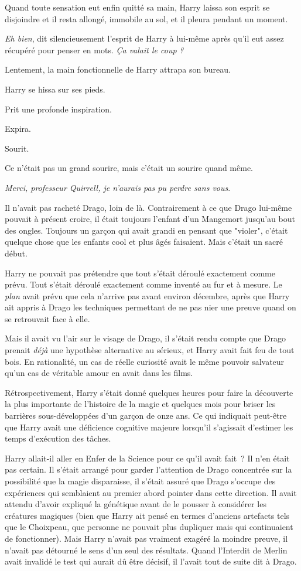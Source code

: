 Quand toute sensation eut enfin quitté sa main, Harry laissa son esprit se disjoindre et il resta allongé, immobile au sol, et il pleura pendant un moment.

\emph{Eh bien}, dit silencieusement l'esprit de Harry à lui-même après qu'il eut assez récupéré pour penser en mots. \emph{Ça valait le coup} \emph{?}

Lentement, la main fonctionnelle de Harry attrapa son bureau.

Harry se hissa sur ses pieds.

Prit une profonde inspiration.

Expira.

Sourit.

Ce n'était pas un grand sourire, mais c'était un sourire quand même.

\emph{Merci, professeur Quirrell, je n'aurais pas pu perdre sans vous}.

Il n'avait pas racheté Drago, loin de là. Contrairement à ce que Drago lui-même pouvait à présent croire, il était toujours l'enfant d'un Mangemort jusqu'au bout des ongles. Toujours un garçon qui avait grandi en pensant que "violer", c'était quelque chose que les enfants cool et plus âgés faisaient. Mais c'était un sacré début.

Harry ne pouvait pas prétendre que tout s'était déroulé exactement comme prévu. Tout s'était déroulé exactement comme inventé au fur et à mesure. Le \emph{plan} avait prévu que cela n'arrive pas avant environ décembre, après que Harry ait appris à Drago les techniques permettant de ne pas nier une preuve quand on se retrouvait face à elle.

Mais il avait vu l'air sur le visage de Drago, il s'était rendu compte que Drago prenait \emph{déjà} une hypothèse alternative au sérieux, et Harry avait fait feu de tout bois. En rationalité, un cas de réelle curiosité avait le même pouvoir salvateur qu'un cas de véritable amour en avait dans les films.

Rétrospectivement, Harry s'était donné quelques heures pour faire la découverte la plus importante de l'histoire de la magie et quelques mois pour briser les barrières sous-développées d'un garçon de onze ans. Ce qui indiquait peut-être que Harry avait une déficience cognitive majeure lorsqu'il s'agissait d'estimer les temps d'exécution des tâches.

Harry allait-il aller en Enfer de la Science pour ce qu'il avait fait~? Il n'en était pas certain. Il s'était arrangé pour garder l'attention de Drago concentrée sur la possibilité que la magie disparaisse, il s'était assuré que Drago s'occupe des expériences qui semblaient au premier abord pointer dans cette direction. Il avait attendu d'avoir expliqué la génétique avant de le pousser à considérer les créatures magiques (bien que Harry ait pensé en termes d'anciens artefacts tels que le Choixpeau, que personne ne pouvait plus dupliquer mais qui continuaient de fonctionner). Mais Harry n'avait pas vraiment exagéré la moindre preuve, il n'avait pas détourné le sens d'un seul des résultats. Quand l'Interdit de Merlin avait invalidé le test qui aurait dû être décisif, il l'avait tout de suite dit à Drago.

